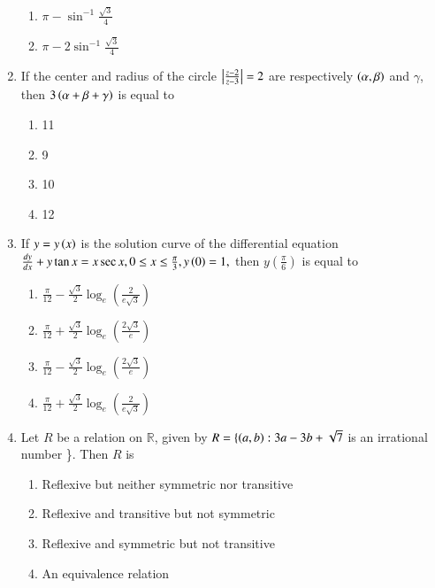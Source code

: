 \documentclass[journal]{IEEEtran}
\begin{document}
\begin{enumerate}
\begin{multicols}{2}
\begin{enumerate}
\item $\pi-\sin^{-1}\frac{\sqrt 3}{4}$
\item $\pi-2\sin^{-1}\frac{\sqrt 3}{4}$
\end{enumerate}
\end{multicols}
\item If the center and radius of the circle $\left\vert\frac{z-2}{z-3}\right\vert=2$ are respectively $\left(\alpha ,\beta\right)$ and $\gamma$, then $3\left(\alpha +\beta +\gamma\right)$ is equal to 
\begin{multicols}{2}
\begin{enumerate}
\item 11
\item 9
\item 10
\item 12
\end{enumerate}
\end{multicols}
\item If $y=y\left(x\right)$ is the solution curve of the differential equation $\frac{dy}{dx}+y\tan{x}=x\sec{x}, 0\le x\le \frac{\pi}{3},y\left(0\right)=1,$ then $y\left(\frac{\pi}{6}\right)$  is equal to
\begin{enumerate}
\item $\frac{\pi}{12}-\frac{\sqrt 3}{2}\log_e\left(\frac{2}{e\sqrt 3}\right)$
\item $\frac{\pi}{12}+\frac{\sqrt 3}{2}\log_e\left(\frac{2\sqrt 3}{e}\right)$
\item $\frac{\pi}{12}-\frac{\sqrt 3}{2}\log_e\left(\frac{2\sqrt 3}{e}\right)$
\item $\frac{\pi}{12}+\frac{\sqrt 3}{2}\log_e\left(\frac{2}{e\sqrt 3}\right)$
\end{enumerate}
\item Let $R$ be a relation on $\mathbb{R}$, given by $R=\{\left(a,b\right): 3a-3b+\sqrt 7$ is an irrational number \}. Then $R$ is 
\begin{enumerate}
\item Reflexive but neither symmetric nor transitive 
\item Reflexive and transitive but not symmetric 
\item Reflexive and symmetric but not transitive 
\item An equivalence relation  
\end{enumerate}	
\end{enumerate}
\end{document}
